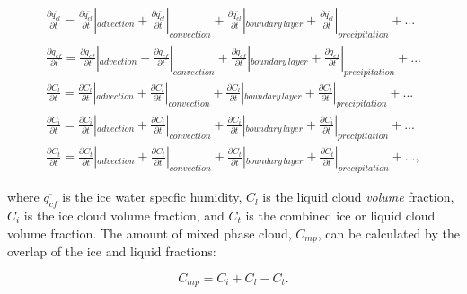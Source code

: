 \documentclass{UMDP_article}
\begin{document}
\begin{eqnarray}
\frac{\partial \overline{q_{cl}}}{\partial t} =
\frac{\partial \overline{q_{cl}}}{\partial t} |_{advection} +
\frac{\partial \overline{q_{cl}}}{\partial t} |_{convection} +
\frac{\partial \overline{q_{cl}}}{\partial t} |_{boundary \, layer} +
\frac{\partial \overline{q_{cl}}}{\partial t} |_{precipitation} + ... \nonumber \\
\frac{\partial \overline{q_{cf}}}{\partial t} =
\frac{\partial \overline{q_{cf}}}{\partial t} |_{advection} +
\frac{\partial \overline{q_{cf}}}{\partial t} |_{convection} +
\frac{\partial \overline{q_{cf}}}{\partial t} |_{boundary \, layer} +
\frac{\partial \overline{q_{cf}}}{\partial t} |_{precipitation} + ... \nonumber \\
\frac{\partial C_l}{\partial t} =
\frac{\partial C_l}{\partial t} |_{advection} +
\frac{\partial C_l}{\partial t} |_{convection} +
\frac{\partial C_l}{\partial t} |_{boundary \, layer} +
\frac{\partial C_l}{\partial t} |_{precipitation} + ... \nonumber \\
\frac{\partial C_i}{\partial t} =
\frac{\partial C_i}{\partial t} |_{advection} +
\frac{\partial C_i}{\partial t} |_{convection} +
\frac{\partial C_i}{\partial t} |_{boundary \, layer} +
\frac{\partial C_i}{\partial t} |_{precipitation} + ... \nonumber \\
\frac{\partial C_t}{\partial t} =
\frac{\partial C_t}{\partial t} |_{advection} +
\frac{\partial C_t}{\partial t} |_{convection} +
\frac{\partial C_t}{\partial t} |_{boundary \, layer} +
\frac{\partial C_t}{\partial t} |_{precipitation} + ... ,
\label{eq:dqcldt_and_dcdt}
\end{eqnarray}

where $\overline{q_{cf}}$ is the ice water specfic humidity, $C_l$ is the liquid
cloud \textit{volume} fraction, $C_i$ is the ice cloud volume fraction, and $C_t$
is the combined ice or liquid cloud volume fraction. The amount of mixed
phase cloud, $C_{mp}$, can be calculated by the overlap of the ice
and liquid fractions:

\begin{equation}
C_{mp} = C_i + C_l - C_t.
\label{eq:mp}
\end{equation}
\end{document}
